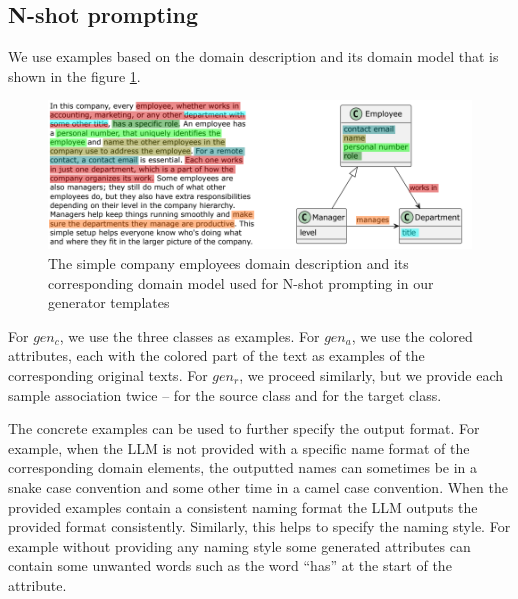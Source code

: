 \subsection{N-shot prompting}

We use examples based on the domain description and its domain model that is shown in the figure \ref{fig:prompting-domain}.

\begin{figure}[!h]
    \centering
    \includegraphics[scale=0.55]{img/prompting-domain.png}
    \caption{\centering The simple company employees domain description and its corresponding domain model used for N-shot prompting in our generator templates}
    \label{fig:prompting-domain}
\end{figure}


For $gen_c$, we use the three classes as examples. For $gen_a$, we use the colored attributes, each with the colored part of the text as examples of the corresponding original texts. For $gen_r$, we proceed similarly, but we provide each sample association twice – for the source class and for the target class.

The concrete examples can be used to further specify the output format. For example,  when the LLM is not provided with a specific name format of the corresponding domain elements, the outputted names can sometimes be in a snake case convention and some other time in a camel case convention. When the provided examples contain a consistent naming format the LLM outputs the provided format consistently. Similarly, this helps to specify the naming style. For example without providing any naming style some generated attributes can contain some unwanted words such as the word ``has'' at the start of the attribute.
